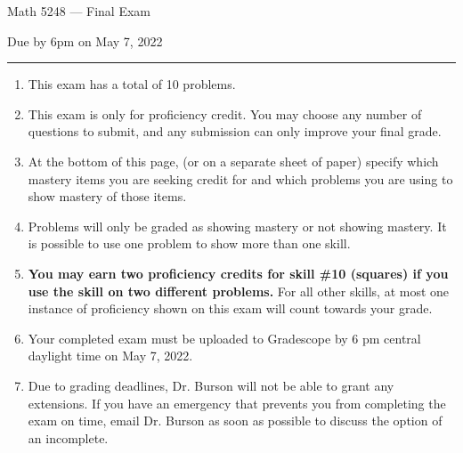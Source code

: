 \documentclass[11pt,addpoints,letterpaper]{exam}
\begin{document}
\vspace*{-0.5in}

\ifprintanswers
\begin{center}
\end{center}
\fi

{\centering

\LARGE Math 5248 --- Final Exam

}

\smallskip

{\centering

\large Due by 6pm on May 7, 2022

}

\bigskip\bigskip


\hrule

\begin{enumerate}[leftmargin=2em,rightmargin=1em]\setlength{\itemsep}{-2pt}


\item This exam has a total of 10 problems. 

\item This exam is only for proficiency credit. You may choose any number of questions to submit, and any submission can only improve your final grade. 

\item At the bottom of this page, (or on a separate sheet of paper) specify which mastery items you are seeking credit for and which problems you are using to show mastery of those items. 

\item Problems will only be graded as showing mastery or not showing mastery.  It is possible to use one problem to show more than one skill. 

\item \textbf{You may earn two proficiency credits for skill \#10 (squares) if you use the skill on two different problems.} For all other skills, at most one instance of proficiency shown on this exam will count towards your grade. 

\item Your completed exam must be uploaded to Gradescope by 6 pm central daylight time on May 7, 2022. 

\item Due to grading deadlines, Dr. Burson will not be able to grant any extensions. If you have an emergency that prevents you from completing the exam on time, email Dr. Burson as soon as possible to discuss the option of an incomplete. 


\end{enumerate}
\end{document}
